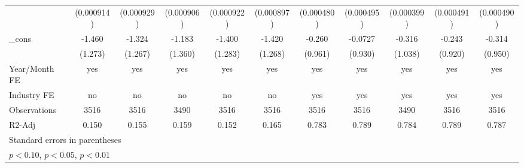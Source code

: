 \begin{table}[htbp]
\begin{tabular}{l*{10}{c}}
                &(0.000914)         &(0.000929)         &(0.000906)         &(0.000922)         &(0.000897)         &(0.000480)         &(0.000495)         &(0.000399)         &(0.000491)         &(0.000490)         \\
\_cons          &   -1.460         &   -1.324         &   -1.183         &   -1.400         &   -1.420         &   -0.260         &  -0.0727         &   -0.316         &   -0.243         &   -0.314         \\
                &  (1.273)         &  (1.267)         &  (1.360)         &  (1.283)         &  (1.268)         &  (0.961)         &  (0.930)         &  (1.038)         &  (0.920)         &  (0.950)         \\
\hline
Year/Month FE   &      yes         &      yes         &      yes         &      yes         &      yes         &      yes         &      yes         &      yes         &      yes         &      yes         \\
Industry FE     &       no         &       no         &       no         &       no         &       no         &      yes         &      yes         &      yes         &      yes         &      yes         \\
Observations    &     3516         &     3516         &     3490         &     3516         &     3516         &     3516         &     3516         &     3490         &     3516         &     3516         \\
R2-Adj          &    0.150         &    0.155         &    0.159         &    0.152         &    0.165         &    0.783         &    0.789         &    0.784         &    0.789         &    0.787         \\
\hline\hline
\multicolumn{11}{l}{\footnotesize Standard errors in parentheses}\\
\multicolumn{11}{l}{\footnotesize \sym{*} \(p<0.10\), \sym{**} \(p<0.05\), \sym{***} \(p<0.01\)}\\
\end{tabular}
\end{table}
